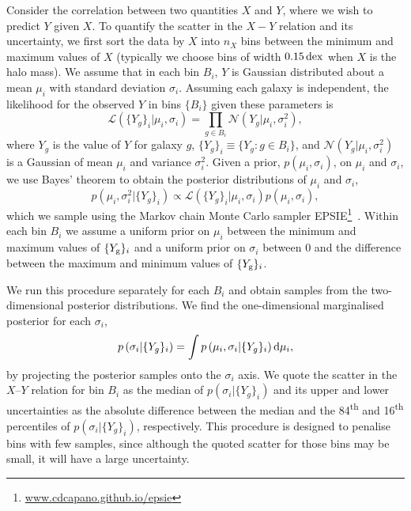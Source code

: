 \documentclass[useAMS,usenatbib]{mnras}
\begin{document}
Consider the correlation between two quantities $X$ and $Y$, where we wish to predict $Y$ given $X$. To quantify the scatter in the $X-Y$ relation and its uncertainty, we first sort the data by $X$ into $n_X$ bins between the minimum and maximum values of $X$ (typically we choose bins of width $0.15{\, \rm dex}$ when $X$ is the halo mass). We assume that in each bin $B_i$, $Y$ is Gaussian distributed about a mean $\mu_i$ with standard deviation $\sigma_i$. Assuming each galaxy is independent, the likelihood for the observed $Y$ in bins $\{B_i\}$ given these parameters is
\begin{equation}
	 \mathcal{L} \left( \{ Y_g \}_i | \mu_i, \sigma_i \right)
	 = \prod_{g \in B_i} \mathcal{N}\left(Y_g | \mu_i, \sigma^2_i\right),
\end{equation}
where $Y_g$ is the value of $Y$ for galaxy $g$, $\{ Y_g \}_i \equiv \{ Y_g : g \in B_i \}$, and $\mathcal{N}( Y_g | \mu_i, \sigma^2_i )$ is a Gaussian of mean $\mu_{i}$ and variance $\sigma_i^2$. Given a prior, $p \left( \mu_i, \sigma_i \right)$, on $\mu_i$ and $\sigma_i$, we use Bayes' theorem to obtain the posterior distributions of $\mu_i$ and $\sigma_i$,
\begin{equation}
	p \left(\mu_i, \sigma_i^2| \{ Y_g \}_i \right)
    \propto \mathcal{L} \left(\{ Y_g \}_i|\mu_i, \sigma_i \right) p \left( \mu_i, \sigma_i \right) ,
\end{equation}
which we sample using the Markov chain Monte Carlo sampler \textsc{EPSIE}\footnote{\href{https://cdcapano.github.io/epsie/latest/index.html}{www.cdcapano.github.io/epsie}}~\citep{epsie}. Within each bin $B_i$ we assume a uniform prior on $\mu_i$ between the minimum and maximum values of  $\{Y_{\rm g}\}_i$ and a uniform prior on $\sigma_i$ between $0$ and the difference between the maximum and minimum values of $\{Y_{\rm g}\}_i$.

We run this procedure separately for each $B_i$ and obtain samples from the two-dimensional posterior distributions. We find the one-dimensional marginalised posterior for each $\sigma_i$,
\begin{equation}
    p \left(\sigma_i| \{ Y_g \}_i \right) = \int p \left(\mu_i, \sigma_i| \{ Y_g \}_i \right) {\rm d}\mu_i,
\end{equation}
by projecting the posterior samples onto the $\sigma_i$ axis. We quote the scatter in the $X$--$Y$ relation for bin $B_i$ as the median of $p \left(\sigma_i| \{ Y_g \}_i \right)$ and its upper and lower uncertainties as the absolute difference between the median and the 84\textsuperscript{th} and 16\textsuperscript{th} percentiles of $p \left(\sigma_i| \{ Y_g \}_i \right)$, respectively. This procedure is designed to penalise bins with few samples, since although the quoted scatter for those bins may be small, it will have a large uncertainty.
\end{document}
